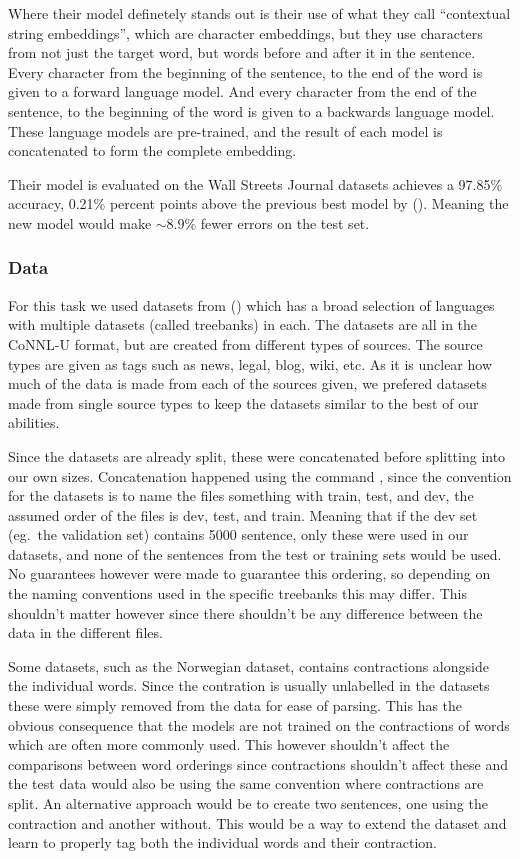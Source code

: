 Where their model definetely stands out is their use of what they call
``contextual string embeddings'', which are character embeddings, but they use
characters from not just the target word, but words before and after it in the
sentence. Every character from the beginning of the sentence, to the end of the
word is given to a forward language model. And every character from the end of
the sentence, to the beginning of the word is given to a backwards language
model. These language models are pre-trained, and the result of each model is
concatenated to form the complete embedding. 

Their model is evaluated on the Wall Streets Journal datasets achieves a 97.85\%
accuracy, 0.21\% percent points above the previous best model by
(\cite{choi2016dynamic}). Meaning the new model would make $\sim8.9\%$ fewer
errors on the test set.

\subsubsection{Data}\label{sec:experiments-pos-data}

For this task we used datasets from (\cite{universaldependencies}) which has a
broad selection of languages with multiple datasets (called treebanks) in each.
The datasets are all in the CoNNL-U format, but are created from different types
of sources. The source types are given as tags such as news, legal, blog, wiki,
etc. As it is unclear how much of the data is made from each of the sources
given, we prefered datasets made from single source types to keep the datasets
similar to the best of our abilities.

Since the datasets are already split, these were concatenated before splitting
into our own sizes. Concatenation happened using the command , since the convention for the datasets is to name the files
something with train, test, and dev, the assumed order of the files is dev,
test, and train. Meaning that if the dev set (eg.\ the validation set) contains
5000 sentence, only these were used in our datasets, and none of the sentences
from the test or training sets would be used. No guarantees however were made to
guarantee this ordering, so depending on the naming conventions used in the
specific treebanks this may differ. This shouldn't matter however since there
shouldn't be any difference between the data in the different files.

Some datasets, such as the Norwegian dataset, contains contractions alongside
the individual words. Since the contration is usually unlabelled in the datasets
these were simply removed from the data for ease of parsing. This has the
obvious consequence that the models are not trained on the contractions of words
which are often more commonly used. This however shouldn't affect the
comparisons between word orderings since contractions shouldn't affect these and
the test data would also be using the same convention where contractions are
split. An alternative approach would be to create two sentences, one using the
contraction and another without. This would be a way to extend the dataset and
learn to properly tag both the individual words and their contraction.

